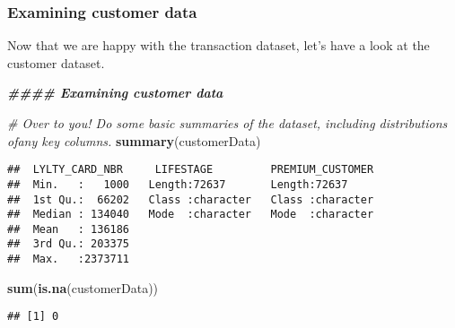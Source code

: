 \documentclass[
]{article}
\newenvironment{Shaded}{\begin{snugshade}}{\end{snugshade}}
\newcommand{\CommentTok}[1]{\textcolor[rgb]{0.56,0.35,0.01}{\textit{#1}}}
\newcommand{\DocumentationTok}[1]{\textcolor[rgb]{0.56,0.35,0.01}{\textbf{\textit{#1}}}}
\newcommand{\FunctionTok}[1]{\textcolor[rgb]{0.13,0.29,0.53}{\textbf{#1}}}
\newcommand{\NormalTok}[1]{#1}
\begin{document}
\subsubsection{Examining customer data}\label{examining-customer-data}

Now that we are happy with the transaction dataset, let's have a look at
the customer dataset.

\begin{Shaded}
\begin{Highlighting}[]
\DocumentationTok{\#\#\#\# Examining customer data}

\CommentTok{\# Over to you! Do some basic summaries of the dataset, including distributions ofany key columns.}
\FunctionTok{summary}\NormalTok{(customerData)}
\end{Highlighting}
\end{Shaded}

\begin{verbatim}
##  LYLTY_CARD_NBR     LIFESTAGE         PREMIUM_CUSTOMER  
##  Min.   :   1000   Length:72637       Length:72637      
##  1st Qu.:  66202   Class :character   Class :character  
##  Median : 134040   Mode  :character   Mode  :character  
##  Mean   : 136186                                        
##  3rd Qu.: 203375                                        
##  Max.   :2373711
\end{verbatim}

\begin{Shaded}
\begin{Highlighting}[]
\FunctionTok{sum}\NormalTok{(}\FunctionTok{is.na}\NormalTok{(customerData))}
\end{Highlighting}
\end{Shaded}

\begin{verbatim}
## [1] 0
\end{verbatim}
\end{document}
